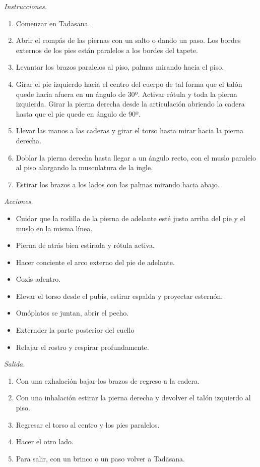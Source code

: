 \emph{Instrucciones.}
\begin{enumerate}
\item Comenzar en Tadāsana.
\item Abrir el compás de las piernas con un
salto o dando un paso. Los bordes externos de
los pies están paralelos a los bordes del
tapete.
\item Levantar los brazos paralelos al piso,
palmas mirando hacia el piso.
\item Girar el pie izquierdo hacia el centro
del cuerpo de tal forma que el talón quede
hacia afuera en un ángulo de 30º. Activar
rótula y toda la pierna izquierda. Girar la
pierna derecha desde la articulación abriendo
la cadera hasta que el pie quede en ángulo de
90º.
\item Llevar las manos a las caderas y girar
el torso hasta mirar hacia la pierna derecha.
\item Doblar la pierna derecha hasta llegar a
un ángulo recto, con el muslo paralelo al
piso alargando la musculatura de la ingle.
\item Estirar los brazos a los lados con las
palmas mirando hacia abajo.
\end{enumerate}

\emph{Acciones.}
\begin{itemize}
\item Cuidar que la rodilla de la pierna de
adelante esté justo arriba del pie y el muslo
en la misma línea.
\item Pierna de atrás bien estirada y rótula
activa.
\item Hacer conciente el arco externo del pie
de adelante.
\item Coxis adentro.
\item Elevar el torso desde el pubis, estirar
espalda y proyectar esternón.
\item Omóplatos se juntan, abrir el pecho.
\item Externder la parte posterior del cuello
\item Relajar el rostro y respirar
profundamente.
\end{itemize}

\emph{Salida.}
\begin{enumerate}
\item Con una exhalación bajar los brazos de
regreso a la cadera.
\item Con una inhalación estirar la pierna
derecha y devolver el talón izquierdo al
piso.
\item Regresar el torso al centro y los pies
paralelos.
\item Hacer el otro lado.
\item Para salir, con un brinco o un paso
volver a Tadāsana.
\end{enumerate}

